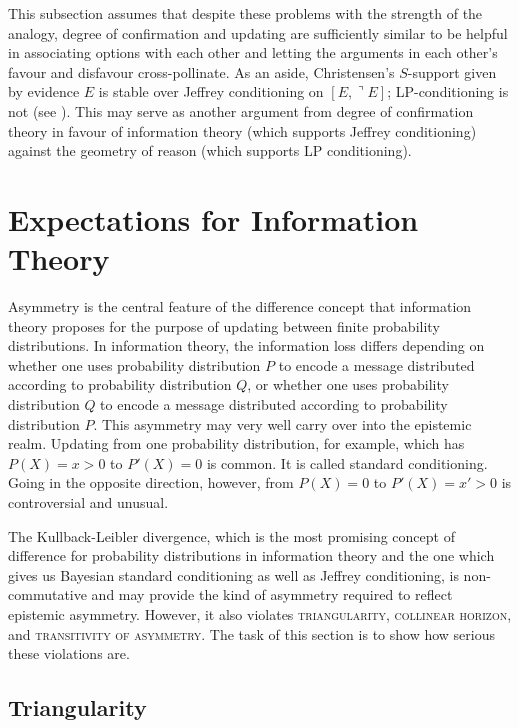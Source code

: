 \documentclass[11pt]{article}
\begin{document}
This subsection assumes that despite these problems with the strength
of the analogy, degree of confirmation and updating are sufficiently
similar to be helpful in associating options with each other and
letting the arguments in each other's favour and disfavour
cross-pollinate. As an aside, Christensen's $S$-support given by
evidence $E$ is stable over Jeffrey conditioning on
$[E,\urcorner{}E]$; LP-conditioning is not (see
). This may serve as another argument
from degree of confirmation theory in favour of information theory
(which supports Jeffrey conditioning) against the geometry of reason
(which supports LP conditioning).

\section{Expectations for Information Theory}
\label{sec:expinfth}

Asymmetry is the central feature of the difference concept that
information theory proposes for the purpose of updating between finite
probability distributions. In information theory, the information loss
differs depending on whether one uses probability distribution $P$ to
encode a message distributed according to probability distribution
$Q$, or whether one uses probability distribution $Q$ to encode a
message distributed according to probability distribution $P$. This
asymmetry may very well carry over into the epistemic realm. Updating
from one probability distribution, for example, which has $P(X)=x>0$
to $P'(X)=0$ is common. It is called standard conditioning. Going in
the opposite direction, however, from $P(X)=0$ to $P'(X)=x'>0$ is
controversial and unusual.

The Kullback-Leibler divergence, which is the most promising concept
of difference for probability distributions in information theory and
the one which gives us Bayesian standard conditioning as well as
Jeffrey conditioning, is non-commutative and may provide the kind of
asymmetry required to reflect epistemic asymmetry. However, it also
violates \textsc{triangularity}, \textsc{collinear horizon}, and
\textsc{transitivity of asymmetry}. The task of this section is to
show how serious these violations are.


\subsection{Triangularity}
\label{subsec:triangularity}
\end{document}
